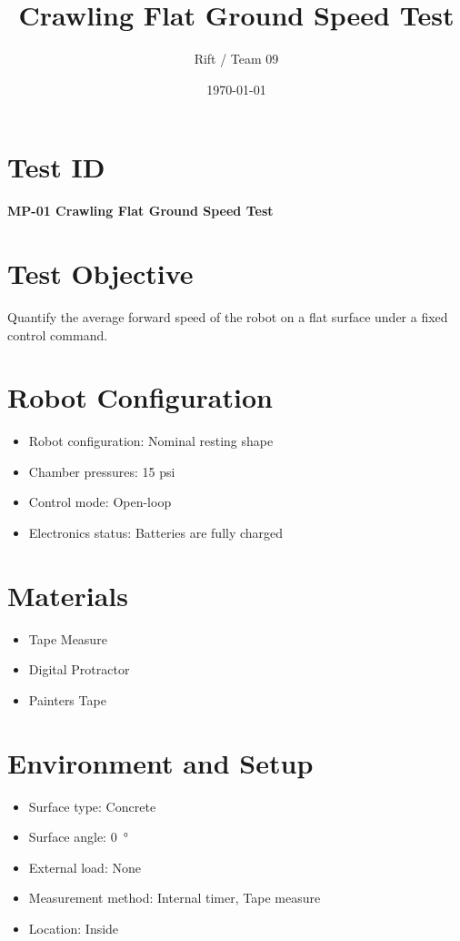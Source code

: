 \documentclass[11pt]{article}
\title{Crawling Flat Ground Speed Test}
\author{Rift / Team 09}
\date{\today}
\begin{document}
\maketitle

\section*{Test ID}
\textbf{MP-01 Crawling Flat Ground Speed Test} 

\section*{Test Objective}
Quantify the average forward speed of the robot on a flat surface under a fixed control command.

\section*{Robot Configuration}
\begin{itemize}[noitemsep]
    \item Robot configuration: Nominal resting shape
    \item Chamber pressures: 15 psi
    \item Control mode: Open-loop
    \item Electronics status: Batteries are fully charged
\end{itemize}

\section*{Materials}
\begin{itemize}[noitemsep]
    \item Tape Measure
    \item Digital Protractor
    \item Painters Tape
    
\end{itemize}

\section*{Environment and Setup}
\begin{itemize}[noitemsep]
    \item Surface type: Concrete
    \item Surface angle: 0~\si{\degree}
    \item External load: None 
    \item Measurement method: Internal timer, Tape measure
    \item Location: Inside
\end{itemize}
\end{document}
